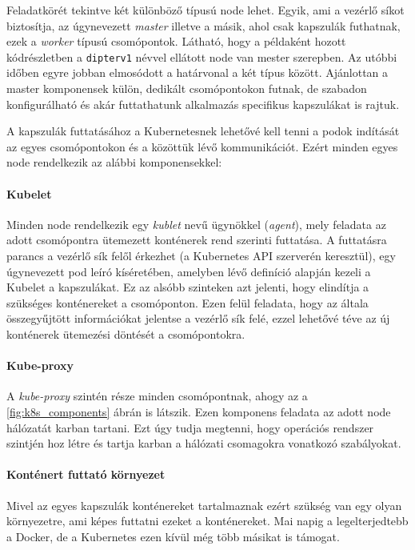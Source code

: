 Feladatkörét tekintve két különböző típusú node lehet.
Egyik, ami a vezérlő síkot biztosítja, az úgynevezett \textit{master} illetve a másik, ahol csak kapszulák futhatnak, ezek a \textit{worker} típusú csomópontok.
Látható, hogy a példaként hozott kódrészletben a \verb+dipterv1+ névvel ellátott node van mester szerepben.
Az utóbbi időben egyre jobban elmosódott a határvonal a két típus között.
Ajánlottan a master komponensek külön, dedikált csomópontokon futnak, de szabadon konfigurálható és akár futtathatunk alkalmazás specifikus kapszulákat is rajtuk.\\

\lstset{caption=Később használt klaszter csomópontjai, label=k8s_nodes}


A kapszulák futtatásához a Kubernetesnek lehetővé kell tenni a podok indítását az egyes csomópontokon és a közöttük lévő kommunikációt. 
Ezért minden egyes node rendelkezik az alábbi komponensekkel:

\paragraph{Kubelet} Minden node rendelkezik egy \textit{kublet} nevű ügynökkel (\textit{agent}), mely feladata az adott csomópontra ütemezett konténerek rend szerinti futtatása. 
A futtatásra parancs a vezérlő sík felől érkezhet (a Kubernetes API szerverén keresztül), egy úgynevezett pod leíró kíséretében, amelyben lévő definíció alapján kezeli a Kubelet a kapszulákat. Ez az alsóbb szinteken azt jelenti, hogy elindítja a szükséges konténereket a csomóponton.
Ezen felül feladata, hogy az általa összegyűjtött információkat jelentse a vezérlő sík felé, ezzel lehetővé téve az új konténerek ütemezési döntését a csomópontokra. 

\paragraph{Kube-proxy} A \textit{kube-proxy} szintén része minden csomópontnak, ahogy az a \ref{fig:k8s_components} ábrán is látszik. Ezen komponens feladata az adott node hálózatát karban tartani. Ezt úgy tudja megtenni, hogy operációs rendszer szintjén hoz létre és tartja karban a hálózati csomagokra vonatkozó szabályokat.

\paragraph{Konténert futtató környezet} Mivel az egyes kapszulák konténereket tartalmaznak ezért szükség van egy olyan környezetre, ami képes futtatni ezeket a konténereket. Mai napig a legelterjedtebb a Docker, de a Kubernetes ezen kívül még több másikat is támogat. 

